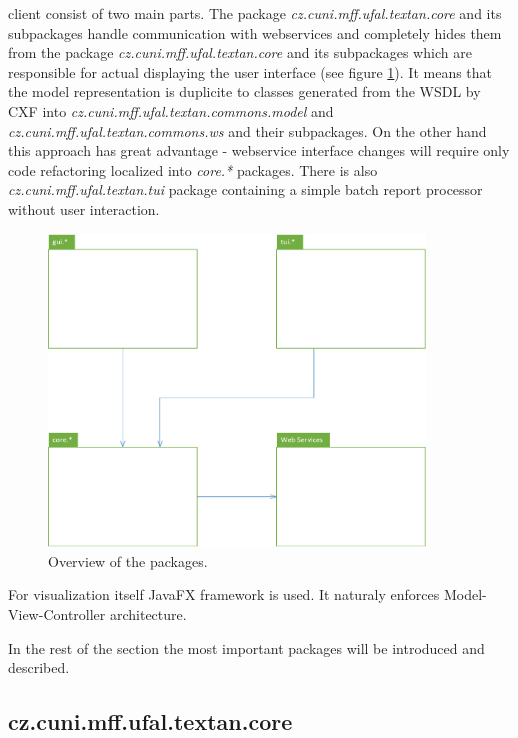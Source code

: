 

\textan{} client consist of two main parts. The package
\emph{cz.cuni.mff.ufal.textan.core} and its subpackages handle communication
with webservices and completely hides them from the package
\emph{cz.cuni.mff.ufal.textan.core} and its subpackages which are responsible
for actual displaying the user interface (see figure \ref{fig:ClientOverview}).
It means that the model representation is duplicite to classes generated from
the WSDL by CXF into \emph{cz.\-cuni.\-mff.\-ufal.\-textan.\-commons.\-model}
and \emph{cz.\-cuni.\-mff.\-ufal.\-textan.\-commons.\-ws} and their subpackages.
On the other hand this approach has great advantage - webservice interface
changes will require only code refactoring localized into \emph{core.*}
packages. There is also \emph{cz.\-cuni.\-mff.\-ufal.\-textan.\-tui} package
containing a simple batch report processor without user interaction.

\begin{figure}[!htb]
        \centering
        \includegraphics[width=10cm]{Images/ClientOverview}
        \caption{Overview of the packages.}
        \label{fig:ClientOverview}
\end{figure}

For visualization itself JavaFX framework is used. It naturaly enforces
Model-View-Controller architecture.

In the rest of the section the most important packages will be introduced and
described.

\subsection{cz.cuni.mff.ufal.textan.core}

